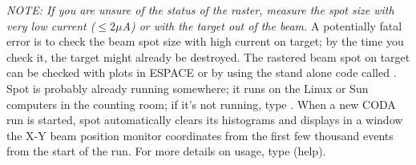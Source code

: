{\it NOTE:  If you are unsure of the status of the raster,
measure the spot size with very low current ($\le 2 \mu$A) or with
the target out of the beam.}  A %
potentially fatal error 
is to check the beam spot size with high current on target; by
the time you check it, the target might already be destroyed.
The rastered beam spot on target can be checked with
plots in ESPACE or by using the stand alone code called .
Spot is probably already running somewhere; it runs on the 
Linux or Sun computers in the counting room; if it's not
running, type .  When a new CODA run is started,
spot automatically clears its histograms and displays 
in a window the X-Y beam position monitor
coordinates from the first few thousand events from the
start of the run.  
For more details on usage, type  (help).


%
%
%
%
%
%
